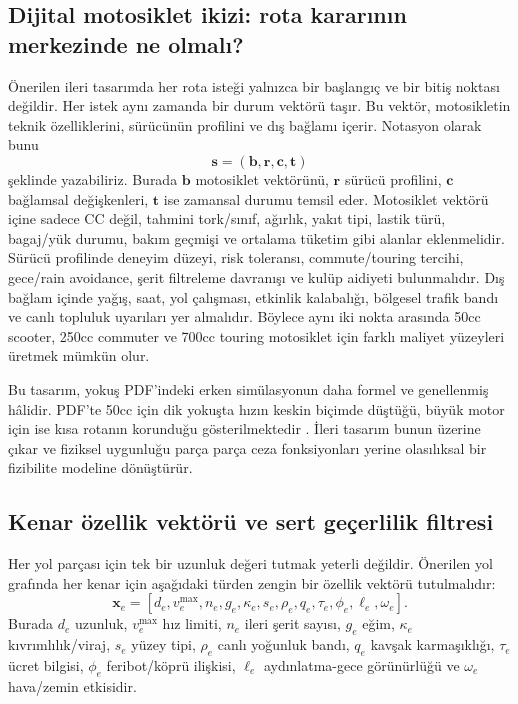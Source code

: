 \documentclass[11pt,a4paper]{article}
\begin{document}
\subsection{Dijital motosiklet ikizi: rota kararının merkezinde ne olmalı?}

Önerilen ileri tasarımda her rota isteği yalnızca bir başlangıç ve bir bitiş noktası değildir. Her istek aynı zamanda bir durum vektörü taşır. Bu vektör, motosikletin teknik özelliklerini, sürücünün profilini ve dış bağlamı içerir. Notasyon olarak bunu
\[
\mathbf{s} = (\mathbf{b},\mathbf{r},\mathbf{c},\mathbf{t})
\]
şeklinde yazabiliriz. Burada $\mathbf{b}$ motosiklet vektörünü, $\mathbf{r}$ sürücü profilini, $\mathbf{c}$ bağlamsal değişkenleri, $\mathbf{t}$ ise zamansal durumu temsil eder. Motosiklet vektörü içine sadece CC değil, tahmini tork/sınıf, ağırlık, yakıt tipi, lastik türü, bagaj/yük durumu, bakım geçmişi ve ortalama tüketim gibi alanlar eklenmelidir. Sürücü profilinde deneyim düzeyi, risk toleransı, commute/touring tercihi, gece/rain avoidance, şerit filtreleme davranışı ve kulüp aidiyeti bulunmalıdır. Dış bağlam içinde yağış, saat, yol çalışması, etkinlik kalabalığı, bölgesel trafik bandı ve canlı topluluk uyarıları yer almalıdır. Böylece aynı iki nokta arasında 50cc scooter, 250cc commuter ve 700cc touring motosiklet için farklı maliyet yüzeyleri üretmek mümkün olur.

Bu tasarım, yokuş PDF'indeki erken simülasyonun daha formel ve genellenmiş hâlidir. PDF'te 50cc için dik yokuşta hızın keskin biçimde düştüğü, büyük motor için ise kısa rotanın korunduğu gösterilmektedir \cite{u2}. İleri tasarım bunun üzerine çıkar ve fiziksel uygunluğu parça parça ceza fonksiyonları yerine olasılıksal bir fizibilite modeline dönüştürür.

\subsection{Kenar özellik vektörü ve sert geçerlilik filtresi}

Her yol parçası için tek bir uzunluk değeri tutmak yeterli değildir. Önerilen yol grafında her kenar için aşağıdaki türden zengin bir özellik vektörü tutulmalıdır:
\[
\mathbf{x}_e = [d_e, v^{\max}_e, n_e, g_e, \kappa_e, s_e, \rho_e, q_e, \tau_e, \phi_e, \ell_e, \omega_e].
\]
Burada $d_e$ uzunluk, $v^{\max}_e$ hız limiti, $n_e$ ileri şerit sayısı, $g_e$ eğim, $\kappa_e$ kıvrımlılık/viraj, $s_e$ yüzey tipi, $\rho_e$ canlı yoğunluk bandı, $q_e$ kavşak karmaşıklığı, $\tau_e$ ücret bilgisi, $\phi_e$ feribot/köprü ilişkisi, $\ell_e$ aydınlatma-gece görünürlüğü ve $\omega_e$ hava/zemin etkisidir. 
\end{document}
